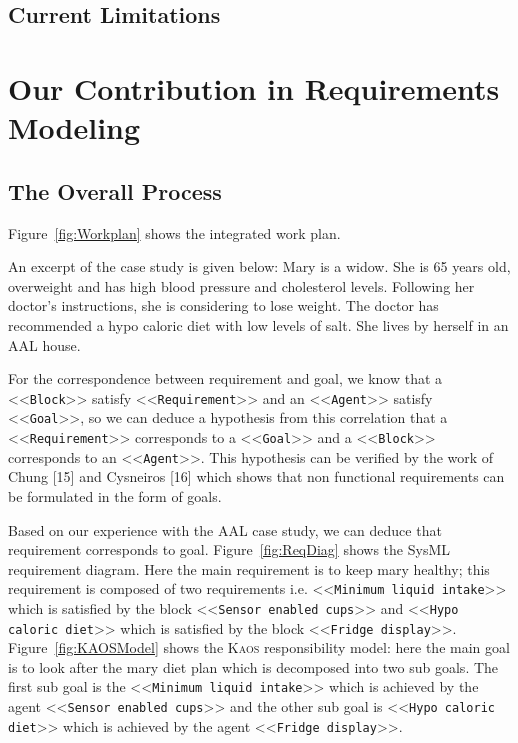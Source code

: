 \documentclass[10pt, conference, compsocconf]{IEEEtran}
\def\kaos{\textsc{Kaos}}
\newcommand{\Myfig}[1]{Figure~\ref{fig:#1}}
\newcommand{\stereotype}[1]{\textless\textless\texttt{#1}\textgreater\textgreater}
\begin{document}
\subsection{Current Limitations}





\section{Our Contribution in Requirements Modeling}\label{sec:contrib}


\subsection{The Overall Process}

\Myfig{Workplan} shows the integrated work plan.

An excerpt of the case study is given below: 
Mary is a widow. She is 65 years old, overweight and has high blood pressure and cholesterol levels. Following her doctor's instructions, she is considering to lose weight. The doctor has recommended a hypo caloric diet with low levels of salt. She lives by herself in an AAL house.


For the correspondence between requirement and goal, we know that a \stereotype{Block} satisfy \stereotype{Requirement} and an \stereotype{Agent} satisfy \stereotype{Goal}, so we can deduce a hypothesis from this correlation that a \stereotype{Requirement} corresponds to a \stereotype{Goal} and a \stereotype{Block} corresponds to an \stereotype{Agent}. This hypothesis can be verified by the work of Chung [15] and Cysneiros [16] which shows that non functional requirements can be formulated in the form of goals. 

Based on our experience with the AAL case study, we can deduce that requirement corresponds to goal. \Myfig{ReqDiag} shows the SysML requirement diagram. Here the main requirement is to keep mary healthy; this requirement is composed of two requirements i.e. \stereotype{Minimum liquid intake} which is satisfied by the block \stereotype{Sensor enabled cups} and \stereotype{Hypo caloric diet} which is satisfied by the block \stereotype{Fridge display}. \Myfig{KAOSModel} shows the \kaos{} responsibility model: here the main goal is to look after the mary diet plan which is decomposed into two sub goals. The first sub goal is the \stereotype{Minimum liquid intake} which is achieved by the agent \stereotype{Sensor enabled cups} and the other sub goal is \stereotype{Hypo caloric diet} which is achieved by the agent \stereotype{Fridge display}.  
\end{document}
